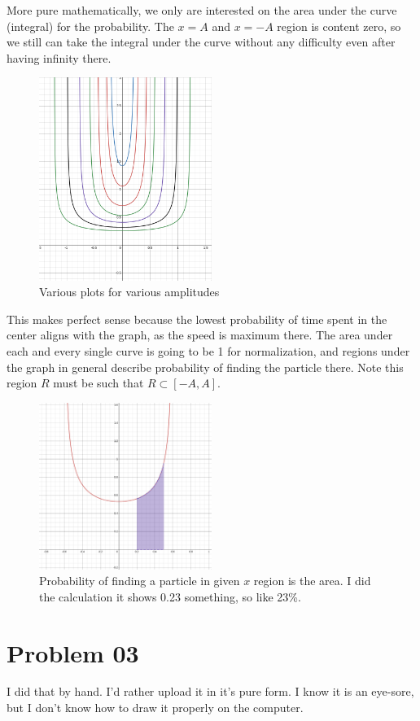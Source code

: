 \documentclass[letter]{article}
\begin{document}
	More pure mathematically, we only are interested on the area under the curve (integral) for the probability. The $x = A$ and $x = -A$ region is content zero, so we still can take the integral under the curve without any difficulty even after having infinity there.  
	\begin{figure}[H]
		\centering
		\includegraphics[width=0.5\textwidth]{ss/ncl02.png}
		\caption{Various plots for various amplitudes}
		\label{fig:ss-ncl01-png}
	\end{figure}

	This makes perfect sense because the lowest probability of time spent in the center aligns with the graph, as the speed is maximum there. The area under each and every single curve is going to be 1 for normalization, and regions under the graph in general describe probability of finding the particle there. Note this region $R$ must be such that $R \subset [-A,A]$. 

\begin{figure}[H]
	\centering
	\includegraphics[width=0.5\textwidth]{ss/ncl03.png}
	\caption{Probability of finding a particle in given $x$ region is the area. I did the calculation it shows 0.23 something, so like 23\%.}
	\label{fig:ss-ncl03-png}
\end{figure}

\newpage
\section{Problem 03} 
I did that by hand. I'd rather upload it in it's pure form. I know it is an eye-sore, but I don't know how to draw it properly on the computer. 
\end{document}
